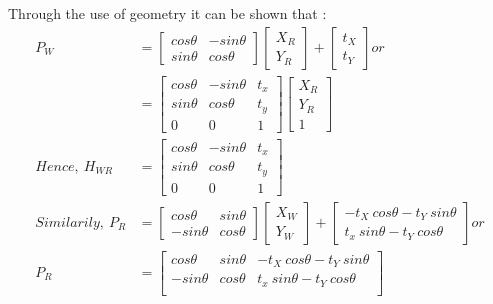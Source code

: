 \documentclass[a4paper,fleqn,11pt]{article}
\theoremstyle{mytheor}
\begin{document}
Through the use of geometry it can be shown that :
\begin{align*}
P_W & = \begin{bmatrix}
			cos \theta & -sin \theta \\
			sin \theta &  cos \theta
		 \end{bmatrix}
		 \begin{bmatrix}
		  	X_R \\
		  	Y_R
		 \end{bmatrix} +
		 \begin{bmatrix}
		  	t_X \\
		  	t_Y
		 \end{bmatrix} or \\
	& = \begin{bmatrix}
			cos \theta & -sin \theta & t_x \\
			sin \theta &  cos \theta & t_y \\
				0	   & 	   0	  &  1
		 \end{bmatrix}
		 \begin{bmatrix}
		  	X_R \\
		  	Y_R \\
		  	 1
		 \end   {bmatrix} \\
Hence,\ H_{WR} & = \begin{bmatrix}
						cos \theta & -sin \theta & t_x \\
						sin \theta &  cos \theta & t_y \\
							0	   & 	   0	  &  1
		 			\end{bmatrix} \\
Similarily,\ P_R & = \begin{bmatrix}
						 cos \theta & sin \theta \\
						-sin \theta &  cos \theta
		 		  	\end{bmatrix}
	    		  	  \begin{bmatrix}
				  		X_W \\
					  	Y_W
					  \end{bmatrix} +
					  \begin{bmatrix}
						-t_X\ cos\theta	- t_Y\ sin\theta \\
						 t_x\ sin\theta - t_Y\ cos\theta
					  \end{bmatrix} or \\
P_R & = \begin{bmatrix}
	 		 cos \theta & sin \theta & -t_X\ cos\theta	- t_Y\ sin\theta \\
	 		-sin \theta & cos \theta &  t_x\ sin\theta - t_Y\ cos\theta \\

\end{bmatrix}
\end{align*}
\end{document}
